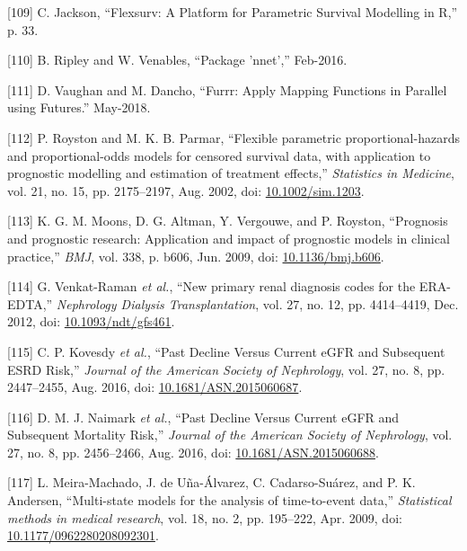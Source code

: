\documentclass[12pt,PhD,twoside,openright]{muthesis}
\newenvironment{cslreferences}%
  {}%
  {\par}
\begin{document}
\begin{cslreferences}
\leavevmode\hypertarget{ref-jackson_flexsurv_nodate}{}%
{[}109{]} C. Jackson, ``Flexsurv: A Platform for Parametric Survival Modelling in R,'' p. 33.

\leavevmode\hypertarget{ref-ripley_package_2016}{}%
{[}110{]} B. Ripley and W. Venables, ``Package 'nnet','' Feb-2016.

\leavevmode\hypertarget{ref-vaughan_furrr_2018}{}%
{[}111{]} D. Vaughan and M. Dancho, ``Furrr: Apply Mapping Functions in Parallel using Futures.'' May-2018.

\leavevmode\hypertarget{ref-royston_flexible_2002}{}%
{[}112{]} P. Royston and M. K. B. Parmar, ``Flexible parametric proportional-hazards and proportional-odds models for censored survival data, with application to prognostic modelling and estimation of treatment effects,'' \emph{Statistics in Medicine}, vol. 21, no. 15, pp. 2175--2197, Aug. 2002, doi: \href{https://doi.org/10.1002/sim.1203}{10.1002/sim.1203}.

\leavevmode\hypertarget{ref-moons_prognosis_2009-1}{}%
{[}113{]} K. G. M. Moons, D. G. Altman, Y. Vergouwe, and P. Royston, ``Prognosis and prognostic research: Application and impact of prognostic models in clinical practice,'' \emph{BMJ}, vol. 338, p. b606, Jun. 2009, doi: \href{https://doi.org/10.1136/bmj.b606}{10.1136/bmj.b606}.

\leavevmode\hypertarget{ref-venkat-raman_new_2012}{}%
{[}114{]} G. Venkat-Raman \emph{et al.}, ``New primary renal diagnosis codes for the ERA-EDTA,'' \emph{Nephrology Dialysis Transplantation}, vol. 27, no. 12, pp. 4414--4419, Dec. 2012, doi: \href{https://doi.org/10.1093/ndt/gfs461}{10.1093/ndt/gfs461}.

\leavevmode\hypertarget{ref-kovesdy_past_2016}{}%
{[}115{]} C. P. Kovesdy \emph{et al.}, ``Past Decline Versus Current eGFR and Subsequent ESRD Risk,'' \emph{Journal of the American Society of Nephrology}, vol. 27, no. 8, pp. 2447--2455, Aug. 2016, doi: \href{https://doi.org/10.1681/ASN.2015060687}{10.1681/ASN.2015060687}.

\leavevmode\hypertarget{ref-naimark_past_2016}{}%
{[}116{]} D. M. J. Naimark \emph{et al.}, ``Past Decline Versus Current eGFR and Subsequent Mortality Risk,'' \emph{Journal of the American Society of Nephrology}, vol. 27, no. 8, pp. 2456--2466, Aug. 2016, doi: \href{https://doi.org/10.1681/ASN.2015060688}{10.1681/ASN.2015060688}.

\leavevmode\hypertarget{ref-meira-machado_multi-state_2009}{}%
{[}117{]} L. Meira-Machado, J. de Uña-Álvarez, C. Cadarso-Suárez, and P. K. Andersen, ``Multi-state models for the analysis of time-to-event data,'' \emph{Statistical methods in medical research}, vol. 18, no. 2, pp. 195--222, Apr. 2009, doi: \href{https://doi.org/10.1177/0962280208092301}{10.1177/0962280208092301}.


\end{cslreferences}
\end{document}
